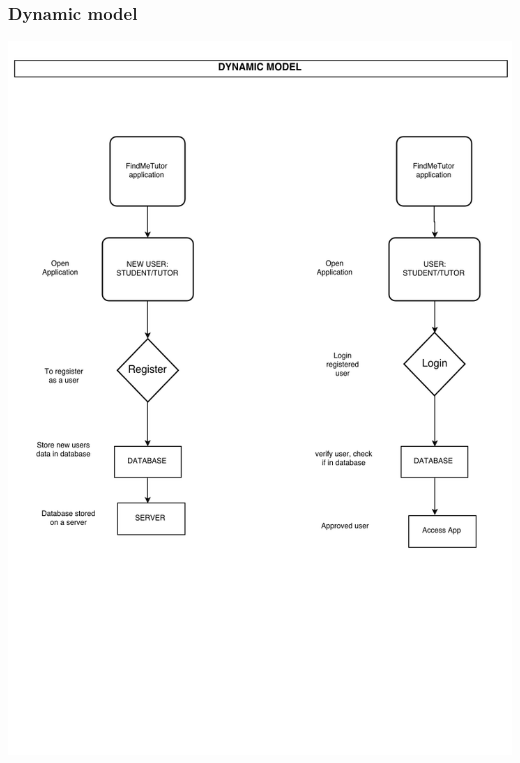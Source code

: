 \documentclass[12pt]{article}
\begin{document}
{\subsubsection{Dynamic model}
\includegraphics[width=140mm]{./Sprint3Models/Dynamic_model3.png}

}
\end{document}
